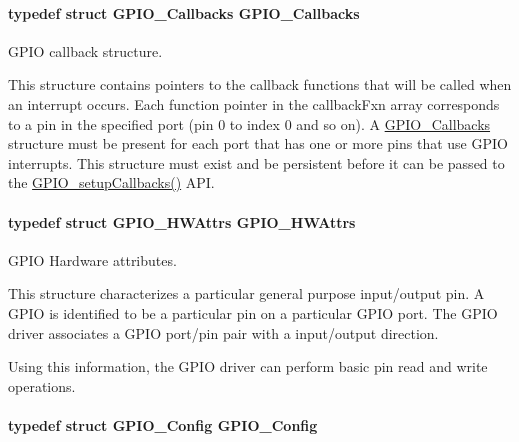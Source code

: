 \paragraph[{G\-P\-I\-O\-\_\-\-Callbacks}]{\setlength{\rightskip}{0pt plus 5cm}typedef struct {\bf G\-P\-I\-O\-\_\-\-Callbacks}  {\bf G\-P\-I\-O\-\_\-\-Callbacks}}\label{_g_p_i_o_8h_aef0e65e0a1d0f0451cafdf0e6db272bf}


G\-P\-I\-O callback structure. 

This structure contains pointers to the callback functions that will be called when an interrupt occurs. Each function pointer in the callback\-Fxn array corresponds to a pin in the specified port (pin 0 to index 0 and so on). A \hyperlink{struct_g_p_i_o___callbacks}{G\-P\-I\-O\-\_\-\-Callbacks} structure must be present for each port that has one or more pins that use G\-P\-I\-O interrupts. This structure must exist and be persistent before it can be passed to the \hyperlink{_g_p_i_o_8h_af00c188a9e451094c5de1109141f30db}{G\-P\-I\-O\-\_\-setup\-Callbacks()} A\-P\-I. 
\paragraph[{G\-P\-I\-O\-\_\-\-H\-W\-Attrs}]{\setlength{\rightskip}{0pt plus 5cm}typedef struct {\bf G\-P\-I\-O\-\_\-\-H\-W\-Attrs}  {\bf G\-P\-I\-O\-\_\-\-H\-W\-Attrs}}\label{_g_p_i_o_8h_ae4ec83381a72983648e99e3e60552781}


G\-P\-I\-O Hardware attributes. 

This structure characterizes a particular general purpose input/output pin. A G\-P\-I\-O is identified to be a particular pin on a particular G\-P\-I\-O port. The G\-P\-I\-O driver associates a G\-P\-I\-O port/pin pair with a input/output direction.

Using this information, the G\-P\-I\-O driver can perform basic pin read and write operations. 
\paragraph[{G\-P\-I\-O\-\_\-\-Config}]{\setlength{\rightskip}{0pt plus 5cm}typedef struct {\bf G\-P\-I\-O\-\_\-\-Config}  {\bf G\-P\-I\-O\-\_\-\-Config}}\label{_g_p_i_o_8h_a2c53b92a39d3be9df0c416318a360482}


